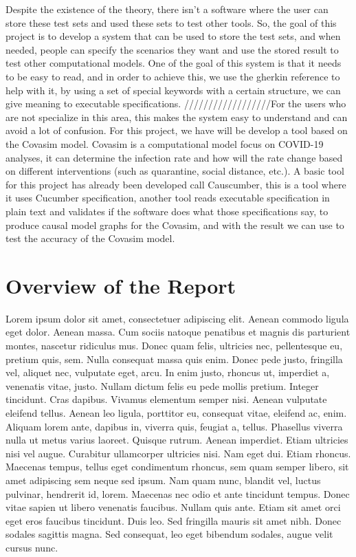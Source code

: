 Despite the existence of the theory, there isn’t a software where the user can store these test sets and used these sets to test other tools. So, the goal of this project is to develop a system that can be used to store the test sets, and when needed, people can specify the scenarios they want and use the stored result to test other computational models. 
One of the goal of this system is that it needs to be easy to read, and in order to achieve this, we use the gherkin reference to help with it, by using a set of special keywords with a certain structure, we can give meaning to executable specifications. 
//////////////////For the users who are not specialize in this area, this makes the system easy to understand and can avoid a lot of confusion. 
For this project, we have will be develop a tool based on the Covasim model. Covasim is a computational model focus on COVID-19 analyses, it can determine the infection rate and how will the rate change based on different interventions (such as quarantine, social distance, etc.). 
A basic tool for this project has already been developed call Causcumber, this is a tool where it uses Cucumber specification, another tool reads executable specification in plain text and validates if the software does what those specifications say, to produce causal model graphs for the Covasim, and with the result we can use to test the accuracy of the Covasim model.


\section{Overview of the Report}

Lorem ipsum dolor sit amet, consectetuer adipiscing elit. Aenean commodo ligula eget dolor. Aenean massa. Cum sociis natoque penatibus et magnis dis parturient montes, nascetur ridiculus mus. Donec quam felis, ultricies nec, pellentesque eu, pretium quis, sem. Nulla consequat massa quis enim. Donec pede justo, fringilla vel, aliquet nec, vulputate eget, arcu. In enim justo, rhoncus ut, imperdiet a, venenatis vitae, justo. Nullam dictum felis eu pede mollis pretium. Integer tincidunt. Cras dapibus. Vivamus elementum semper nisi. Aenean vulputate eleifend tellus. Aenean leo ligula, porttitor eu, consequat vitae, eleifend ac, enim. Aliquam lorem ante, dapibus in, viverra quis, feugiat a, tellus. Phasellus viverra nulla ut metus varius laoreet. Quisque rutrum. Aenean imperdiet. Etiam ultricies nisi vel augue. Curabitur ullamcorper ultricies nisi. Nam eget dui. Etiam rhoncus. Maecenas tempus, tellus eget condimentum rhoncus, sem quam semper libero, sit amet adipiscing sem neque sed ipsum. Nam quam nunc, blandit vel, luctus pulvinar, hendrerit id, lorem. Maecenas nec odio et ante tincidunt tempus. Donec vitae sapien ut libero venenatis faucibus. Nullam quis ante. Etiam sit amet orci eget eros faucibus tincidunt. Duis leo. Sed fringilla mauris sit amet nibh. Donec sodales sagittis magna. Sed consequat, leo eget bibendum sodales, augue velit cursus nunc.
